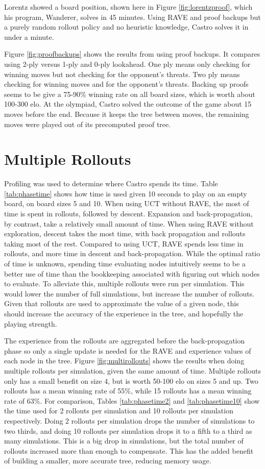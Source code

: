 Lorentz showed a board position, shown here in Figure \ref{fig:lorentzproof}, which his program, Wanderer, solves in 45 minutes. Using RAVE and proof backups but a purely random rollout policy and no heuristic knowledge, Castro solves it in under a minute.

Figure \ref{fig:proofbackups} shows the results from using proof backups. It compares using 2-ply versus 1-ply and 0-ply lookahead. One ply means only checking for winning moves but not checking for the opponent's threats. Two ply means checking for winning moves and for the opponent's threats. Backing up proofs seems to be give a 75-90\% winning rate on all board sizes, which is worth about 100-300 elo. At the olympiad, Castro solved the outcome of the game about 15 moves before the end. Because it keeps the tree between moves, the remaining moves were played out of its precomputed proof tree.


\section{Multiple Rollouts}

Profiling was used to determine where Castro spends its time. Table \ref{tab:phasetime} shows how time is used given 10 seconds to play on an empty board, on board sizes 5 and 10. When using UCT without RAVE, the most of time is spent in rollouts, followed by descent. Expansion and back-propagation, by contrast, take a relatively small amount of time. When using RAVE without exploration, descent takes the most time, with back propagation and rollouts taking most of the rest. Compared to using UCT, RAVE spends less time in rollouts, and more time in descent and back-propagation. While the optimal ratio of time is unknown, spending time evaluating nodes intuitively seems to be a better use of time than the bookkeeping associated with figuring out which nodes to evaluate. To alleviate this, multiple rollouts were run per simulation. This would lower the number of full simulations, but increase the number of rollouts. Given that rollouts are used to approximate the value of a given node, this should increase the accuracy of the experience in the tree, and hopefully the playing strength.


The experience from the rollouts are aggregated before the back-propagation phase so only a single update is needed for the RAVE and experience values of each node in the tree. Figure \ref{fig:multirollouts} shows the results when doing multiple rollouts per simulation, given the same amount of time. Multiple rollouts only has a small benefit on size 4, but is worth 50-100 elo on sizes 5 and up. Two rollouts has a mean winning rate of 55\%, while 15 rollouts has a mean winning rate of 63\%. For comparison, Tables \ref{tab:phasetime2} and \ref{tab:phasetime10} show the time used for 2 rollouts per simulation and 10 rollouts per simulation respectively. Doing 2 rollouts per simulation drops the number of simulations to two thirds, and doing 10 rollouts per simulation drops it to a fifth to a third as many simulations. This is a big drop in simulations, but the total number of rollouts increased more than enough to compensate. This has the added benefit of building a smaller, more accurate tree, reducing memory usage.

